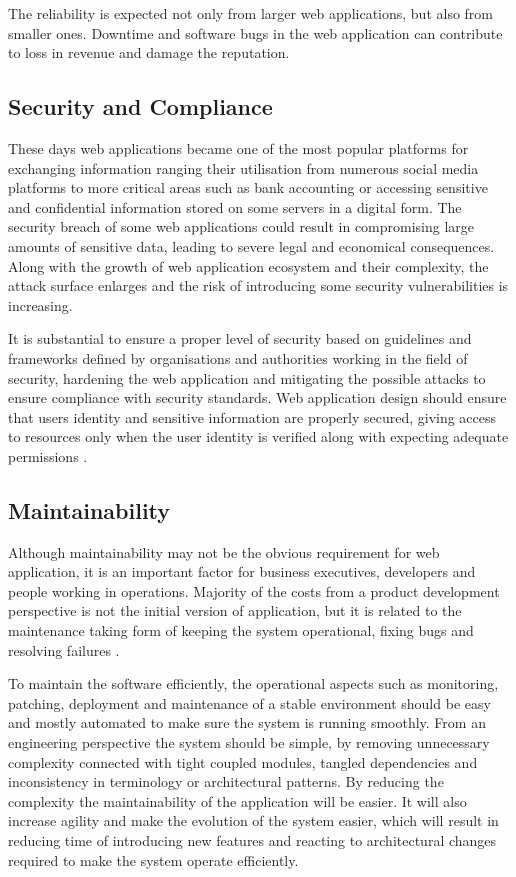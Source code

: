 The reliability is expected not only from larger web applications, but also from smaller ones. Downtime and software bugs in the web application can contribute to loss in revenue and damage the reputation.

\subsection*{Security and Compliance}

These days web applications became one of the most popular platforms for exchanging information ranging their utilisation from numerous social media platforms to more critical areas such as bank accounting or accessing sensitive and confidential information stored on some servers in a digital form. The security breach of some web applications could result in compromising large amounts of sensitive data, leading to severe legal and economical consequences. Along with the growth of web application ecosystem and their complexity, the attack surface enlarges and the risk of introducing some security vulnerabilities is increasing.

It is substantial to ensure a proper level of security based on guidelines and frameworks defined by organisations and authorities working in the field of security, hardening the web application and mitigating the possible attacks to ensure compliance with security standards. Web application design should ensure that users identity and sensitive information are properly secured, giving access to resources only when the user identity is verified along with expecting adequate permissions \cite{ASurveyonWebApplicationSecurity}.

\subsection*{Maintainability}

Although maintainability may not be the obvious requirement for web application, it is an important factor for business executives, developers and people working in operations. Majority of the costs from a product development perspective is not the initial version of application, but it is related to the maintenance taking form of keeping the system operational, fixing bugs and resolving failures \cite{DesignDataIntensiveApplications}.

To maintain the software efficiently, the operational aspects such as monitoring, patching, deployment and maintenance of a stable environment should be easy and mostly automated to make sure the system is running smoothly. From an engineering perspective the system should be simple, by removing unnecessary complexity connected with tight coupled modules, tangled dependencies and inconsistency in terminology or architectural patterns. By reducing the complexity the maintainability of the application will be easier. It will also increase agility and make the evolution of the system easier, which will result in reducing time of introducing new features and reacting to architectural changes required to make the system operate efficiently.

